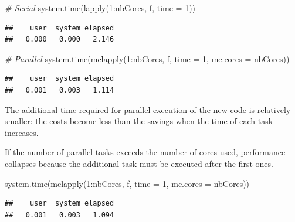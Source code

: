 \documentclass[
  12pt,
  american,
  a4paper,
  extrafontsizes,onecolumn,openright
  ]{memoir}
\newenvironment{Shaded}{\begin{snugshade}}{\end{snugshade}}
\newcommand{\AttributeTok}[1]{\textcolor[rgb]{0.77,0.63,0.00}{#1}}
\newcommand{\CommentTok}[1]{\textcolor[rgb]{0.56,0.35,0.01}{\textit{#1}}}
\newcommand{\DecValTok}[1]{\textcolor[rgb]{0.00,0.00,0.81}{#1}}
\newcommand{\FunctionTok}[1]{\textcolor[rgb]{0.00,0.00,0.00}{#1}}
\newcommand{\NormalTok}[1]{#1}
\newcommand{\SpecialCharTok}[1]{\textcolor[rgb]{0.00,0.00,0.00}{#1}}
\newlength{\rf}
\begin{document}
\scriptsize

\begin{Shaded}
\begin{Highlighting}[]
\CommentTok{\# Serial}
\FunctionTok{system.time}\NormalTok{(}\FunctionTok{lapply}\NormalTok{(}\DecValTok{1}\SpecialCharTok{:}\NormalTok{nbCores, f, }\AttributeTok{time =} \DecValTok{1}\NormalTok{))}
\end{Highlighting}
\end{Shaded}

\begin{verbatim}
##    user  system elapsed 
##   0.000   0.000   2.146
\end{verbatim}

\begin{Shaded}
\begin{Highlighting}[]
\CommentTok{\# Parallel}
\FunctionTok{system.time}\NormalTok{(}\FunctionTok{mclapply}\NormalTok{(}\DecValTok{1}\SpecialCharTok{:}\NormalTok{nbCores, f, }\AttributeTok{time =} \DecValTok{1}\NormalTok{, }\AttributeTok{mc.cores =}\NormalTok{ nbCores))}
\end{Highlighting}
\end{Shaded}

\begin{verbatim}
##    user  system elapsed 
##   0.001   0.003   1.114
\end{verbatim}

\normalsize

The additional time required for parallel execution of the new code is relatively smaller: the costs become less than the savings when the time of each task increases.

If the number of parallel tasks exceeds the number of cores used, performance collapses because the additional task must be executed after the first ones.

\scriptsize

\begin{Shaded}
\begin{Highlighting}[]
\FunctionTok{system.time}\NormalTok{(}\FunctionTok{mclapply}\NormalTok{(}\DecValTok{1}\SpecialCharTok{:}\NormalTok{nbCores, f, }\AttributeTok{time =} \DecValTok{1}\NormalTok{, }\AttributeTok{mc.cores =}\NormalTok{ nbCores))}
\end{Highlighting}
\end{Shaded}

\begin{verbatim}
##    user  system elapsed 
##   0.001   0.003   1.094
\end{verbatim}
\end{document}
